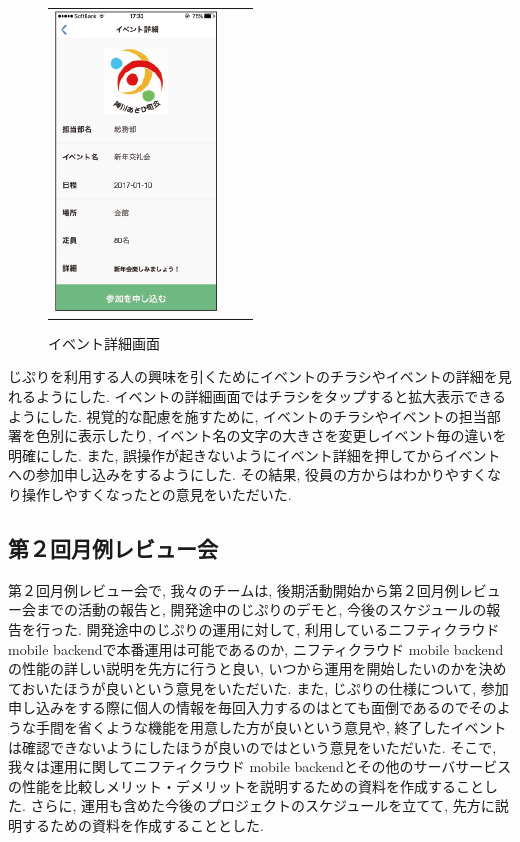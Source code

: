 \begin{figure}[h]
\begin{tabular}{ccc}
      \begin{minipage}[t]{0.3\hsize}
        \centering
        \includegraphics[keepaspectratio, scale=0.45]{picture/ui_update/afterupdate2.png}
        \caption{イベント詳細画面}
        \label{eventdetail}
      \end{minipage}
    \end{tabular}
\end{figure}

じぷりを利用する人の興味を引くためにイベントのチラシやイベントの詳細を見れるようにした.
イベントの詳細画面ではチラシをタップすると拡大表示できるようにした. 視覚的な配慮を施すために,
イベントのチラシやイベントの担当部署を色別に表示したり, イベント名の文字の大きさを変更しイベント毎の違いを明確にした.
また, 誤操作が起きないようにイベント詳細を押してからイベントへの参加申し込みをするようにした. その結果, 役員の方からはわかりやすくなり操作しやすくなったとの意見をいただいた.

\subsection{第２回月例レビュー会}
第２回月例レビュー会で, 我々のチームは, 後期活動開始から第２回月例レビュー会までの活動の報告と, 開発途中のじぷりのデモと, 今後のスケジュールの報告を行った.
開発途中のじぷりの運用に対して, 利用しているニフティクラウド mobile backendで本番運用は可能であるのか, ニフティクラウド mobile backendの性能の詳しい説明を先方に行うと良い,
いつから運用を開始したいのかを決めておいたほうが良いという意見をいただいた.
また, じぷりの仕様について, 参加申し込みをする際に個人の情報を毎回入力するのはとても面倒であるのでそのような手間を省くような機能を用意した方が良いという意見や,
終了したイベントは確認できないようにしたほうが良いのではという意見をいただいた.
そこで, 我々は運用に関してニフティクラウド mobile backendとその他のサーバサービスの性能を比較しメリット・デメリットを説明するための資料を作成することした.
さらに, 運用も含めた今後のプロジェクトのスケジュールを立てて, 先方に説明するための資料を作成することとした.


